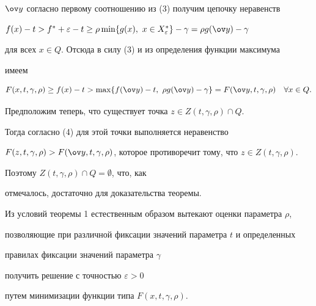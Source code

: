 \begin{pf}
$\ov y$ согласно первому соотношению из (3) получим цепочку неравенств 


$f(x)-t>f^*+\varepsilon-t\ge


\rho\min\{g(x),\ x\in X_{\varepsilon}^*\}-\gamma=\rho g(\ov y)-\gamma$ 


для всех $x\in Q$. Отсюда в силу (3) и из определения функции максимума


имеем 


\begin{equation}


F(x,t,\gamma,\rho)\ge f(x)-t>\max\{f(\ov y)-t,\ \rho g(\ov


y)-\gamma\}=F(\ov y,t,\gamma,\rho) \quad \forall x\in Q.


\end{equation}





Предположим теперь, что существует точка $z\in Z(t,\gamma,\rho)\cap Q$.


Тогда согласно (4) для этой точки выполняется неравенство


$F(z,t,\gamma,\rho)>F(\ov


y,t,\gamma,\rho)$, которое противоречит тому, что $z\in Z(t,\gamma,\rho)$. 


Поэтому $Z(t,\gamma,\rho)\cap Q=\emptyset$, что, как


отмечалось, достаточно для доказательства теоремы.


\end{pf}





Из условий теоремы 1 естественным образом вытекают оценки параметра $\rho$,


позволяющие при различной фиксации значений параметра $t$ и определенных


правилах фиксации значений параметра $\gamma$


получить решение с точностью $\varepsilon>0$ 


путем минимизации функции типа $F(x,t,\gamma,\rho)$.





